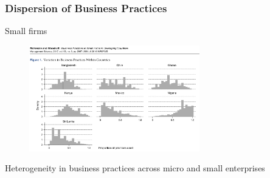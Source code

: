 \documentclass[hideothersubsections, usenames,dvipsnames,11pt]{beamer}
\newenvironment{itemize_2pt}{\itemize\addtolength{\itemsep}{2pt}}{\enditemize}
\begin{document}
\begin{frame}
\frametitle{Dispersion of Business Practices}

Small firms

\begin{figure}[htbp]
	\centering
	\includegraphics[width=20em]{pics/McKenzie2017_mgmtdispersion.png}
	\label{McKenzie(2017): Mgmt practices}
\end{figure}

\vspace{-1.0em}

\begin{itemize_2pt}
	\item Heterogeneity in business practices across micro and small enterprises \citep{McKenzie2017}
\end{itemize_2pt}
\end{frame}


\end{document}
